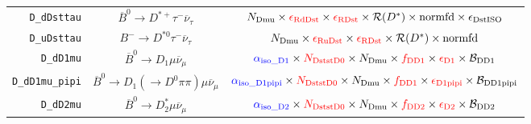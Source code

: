 \begin{landscape}
\begin{table}
\begin{tabular}{r|c|c}
      \texttt{D\_dDsttau} &            $\overline{B}^0 \rightarrow D^{*+} \tau^- \overline{\nu}_\tau$            &                                                                                              $N_\text{Dmu} \times \textcolor{red}{\epsilon_\text{RdDst}} \times \textcolor{red}{\epsilon_\text{RDst}} \times \mathcal{R}(D^*) \times \text{normfd} \times \epsilon_\text{DstISO}$                                                                                              \\
      \texttt{D\_uDsttau} &                 $B^- \rightarrow D^{*0} \tau^- \overline{\nu}_\tau$                  &                                                                                                             $N_\text{Dmu} \times \textcolor{red}{\epsilon_\text{RuDst}} \times \textcolor{red}{\epsilon_\text{RDst}} \times \mathcal{R}(D^*) \times \text{normfd}$                                                                                                             \\
        \texttt{D\_dD1mu} &               $\overline{B}^0 \rightarrow D_1 \mu \overline{\nu}_\mu$                &                                                                              $\textcolor{blue}{\alpha_\text{iso\_D1}} \times \textcolor{red}{N_\text{DststD0}} \times N_\text{Dmu} \times \textcolor{red}{f_\text{DD1}} \times \textcolor{red}{\epsilon_\text{D1}} \times \mathcal{B}_\text{DD1}$                                                                              \\
  \texttt{D\_dD1mu\_pipi} &   $\overline{B}^0 \rightarrow D_1 (\rightarrow D^0 \pi\pi) \mu \overline{\nu}_\mu$   &                                                                        $\textcolor{blue}{\alpha_\text{iso\_D1pipi}} \times \textcolor{red}{N_\text{DststD0}} \times N_\text{Dmu} \times \textcolor{red}{f_\text{DD1}} \times \textcolor{red}{\epsilon_\text{D1pipi}} \times \mathcal{B}_\text{DD1pipi}$                                                                        \\
        \texttt{D\_dD2mu} &              $\overline{B}^0 \rightarrow D^*_2 \mu \overline{\nu}_\mu$               &                                                                              $\textcolor{blue}{\alpha_\text{iso\_D2}} \times \textcolor{red}{N_\text{DststD0}} \times N_\text{Dmu} \times \textcolor{red}{f_\text{DD2}} \times \textcolor{red}{\epsilon_\text{D2}} \times \mathcal{B}_\text{DD2}$                                                                              \\

\end{tabular}
\end{table}
\end{landscape}
